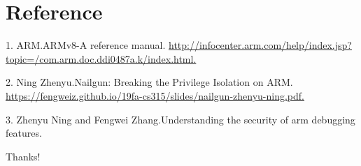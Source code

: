 \documentclass{beamer}
\begin{document}
\section{Reference}

\begin{frame}[allowframebreaks]
1. ARM.ARMv8-A reference manual.
\url{http://infocenter.arm.com/help/index.jsp?topic=/com.arm.doc.ddi0487a.k/index.html.}

2. Ning Zhenyu.Nailgun: Breaking the Privilege Isolation on ARM.
\url{https://fengweiz.github.io/19fa-cs315/slides/nailgun-zhenyu-ning.pdf.}

3. Zhenyu Ning and Fengwei Zhang.Understanding the security of arm debugging features.
    
    
\end{frame}

\begin{frame}
    \begin{center}
        {\Huge\calligra Thanks!}
    \end{center}
\end{frame}





\end{document}
